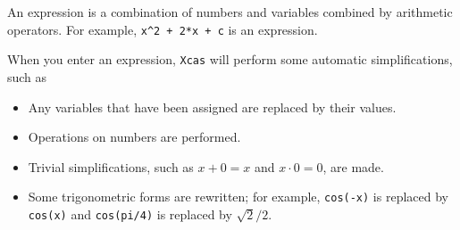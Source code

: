 \documentclass{article}
\begin{document}
An expression is a combination of numbers and variables combined by
arithmetic operators.  For example, \texttt{x\^{}2 + 2*x + c} is an
expression. 

When you enter an expression, \texttt{Xcas} will perform some
automatic simplifications, such as
\begin{itemize}
  \item
  Any variables that have been assigned are replaced by their values.
  \item
  Operations on numbers are performed.
  \item
  Trivial simplifications, such as $x+0=x$ and $x\cdot 0 = 0$, are made.
  \item
  Some trigonometric forms are rewritten; for example, \texttt{cos(-x)} is
  replaced by \texttt{cos(x)} and \texttt{cos(pi/4)} is replaced by $\sqrt{2}/2$.
\end{itemize}
\end{document}
